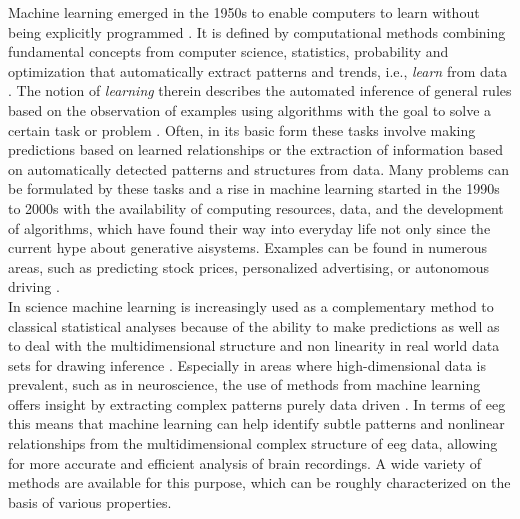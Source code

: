 Machine learning emerged in the 1950s to enable computers to learn without being explicitly programmed \cite{Samual1959}. It is defined by computational methods combining fundamental concepts from computer science, statistics, probability and optimization that automatically extract patterns and trends, i.e., \textit{learn} from data \cite{Hastie2009}. The notion of \textit{learning} therein describes the automated inference of general rules based on the observation of examples using algorithms with the goal to solve a certain task or problem \cite{Von_luxburg2011}. Often, in its basic form these tasks involve making predictions based on learned relationships or the extraction of information based on automatically detected patterns and structures from data. Many problems can be formulated by these tasks and a rise in machine learning started in the 1990s to 2000s with the availability of computing resources, data, and the development of algorithms, which have found their way into everyday life not only since the current hype about generative \gls{ai}systems. Examples can be found in numerous areas, such as predicting stock prices, personalized advertising, or autonomous driving \cite{Rudin2014}.\\
In science machine learning is increasingly used as a complementary method to classical statistical analyses because of the ability to make predictions as well as to deal with the multidimensional structure and non linearity in real world data sets for drawing inference \cite{Bzdok2018}. Especially in areas where high-dimensional data is prevalent, such as in neuroscience, the use of methods from machine learning offers insight by extracting complex patterns purely data driven \cite{Brunton2019}. In terms of \gls{eeg} this means that machine learning can help identify subtle patterns and nonlinear relationships from the multidimensional complex structure of \gls{eeg} data, allowing for more accurate and efficient analysis of brain recordings. A wide variety of methods are available for this purpose, which can be roughly characterized on the basis of various properties. 


